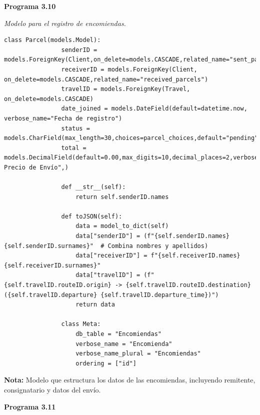 		\textbf{Programa 3.10}
		
		\textit{Modelo para el registro de encomiendas.} %
		\vspace{0.3cm} %
		\begin{lstlisting}[lineskip=-1pt]
			class Parcel(models.Model):
				senderID = models.ForeignKey(Client,on_delete=models.CASCADE,related_name="sent_parcels")
				receiverID = models.ForeignKey(Client, on_delete=models.CASCADE,related_name="received_parcels")
				travelID = models.ForeignKey(Travel, on_delete=models.CASCADE)
				date_joined = models.DateField(default=datetime.now, verbose_name="Fecha de registro")
				status = models.CharField(max_length=30,choices=parcel_choices,default="pending",verbose_name="Estado",blank=True,)
				total = models.DecimalField(default=0.00,max_digits=10,decimal_places=2,verbose_name="Total Precio de Envío",)
			
				def __str__(self):
					return self.senderID.names
						
				def toJSON(self):
					data = model_to_dict(self)
					data["senderID"] = (f"{self.senderID.names} {self.senderID.surnames}"  # Combina nombres y apellidos)
					data["receiverID"] = f"{self.receiverID.names} {self.receiverID.surnames}"
					data["travelID"] = (f"{self.travelID.routeID.origin} -> {self.travelID.routeID.destination} ({self.travelID.departure} {self.travelID.departure_time})")
					return data
			
				class Meta:
					db_table = "Encomiendas"
					verbose_name = "Encomienda"
					verbose_name_plural = "Encomiendas"
					ordering = ["id"]
		\end{lstlisting}
		
		\textbf{Nota:} Modelo que estructura los datos de las encomiendas, incluyendo remitente, consignatario y datos del envío.
		
		\textbf{Programa 3.11}
		
